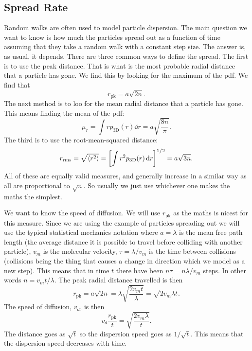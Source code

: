 \documentclass[a4paper]{article}
\begin{document}
    \subsection{Spread Rate}
    Random walks are often used to model particle dispersion.
    The main question we want to know is how much the particles spread out as a function of time assuming that they take a random walk with a constant step size.
    The answer is, as usual, it depends.
    There are three common ways to define the spread.
    The first is to use the peak distance.
    That is what is the most probable radial distance that a particle has gone.
    We find this by looking for the maximum of the \gls{pdf}.
    We find that
    \[r_{\mathrm{pk}} = a\sqrt{2n}.\]
    The next method is to loo for the mean radial distance that a particle has gone.
    This means finding the mean of the \gls{pdf}:
    \[\mu_r = \int rp_{\mathrm{3D}}(r) \dd{r} = a\sqrt{\frac{8n}{\pi}}.\]
    The third is to use the root-mean-squared distance:
    \[r_{\mathrm{rms}} = \sqrt{\langle{r^2}\rangle} = \left[\int r^2p_{\mathrm{3D}}(r) \dd{r}\right]^{1/2} = a\sqrt{3n}.\]
    All of these are equally valid measures, and generally increase in a similar way as all are proportional to \(\sqrt{n}\).
    So usually we just use whichever one makes the maths the simplest.
    
    We want to know the speed of diffusion.
    We will use \(r_{\mathrm{pk}}\) as the maths is nicest for this measure.
    Since we are using the example of particles spreading out we will use the typical statistical mechanics notation where \(a = \lambda\) is the mean free path length (the average distance it is possible to travel before colliding with another particle), \(v_m\) is the molecular velocity, \(\tau = \lambda/v_m\) is the time between collisions (collisions being the thing that causes a change in direction which we model as a new step).
    This means that in time \(t\) there have been \(n\tau = n\lambda/v_m\) steps.
    In other words \(n = v_mt/\lambda\).
    The peak radial distance travelled is then
    \[r_{\mathrm{pk}} = a\sqrt{2n} = \lambda\sqrt{\frac{2v_mt}{\lambda}} = \sqrt{2v_m\lambda t}.\]
    The speed of diffusion, \(v_d\), is then
    \[v_d \frac{r_{\mathrm{pk}}}{t} = \sqrt{\frac{2v_m\lambda}{t}}.\]
    The distance goes as \(\sqrt{t}\) so the dispersion speed goes as \(1/\sqrt{t}\).
    This means that the dispersion speed decreases with time.
    
\end{document}
